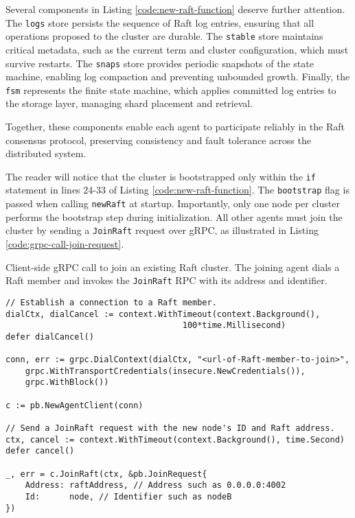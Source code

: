 Several components in Listing \ref{code:new-raft-function} deserve further attention.  
The \texttt{logs} store persists the sequence of Raft log entries, ensuring that all operations proposed to the cluster are durable. The \texttt{stable} store maintains critical metadata, such as the current term and cluster configuration, which must survive restarts. The \texttt{snaps} store provides periodic snapshots of the state machine, enabling log compaction and preventing unbounded growth. Finally, the \texttt{fsm} represents the finite state machine, which applies committed log entries to the storage layer, managing shard placement and retrieval.  

Together, these components enable each agent to participate reliably in the Raft consensus protocol, preserving consistency and fault tolerance across the distributed system.

The reader will notice that the cluster is bootstrapped only within the \texttt{if} statement in lines 24-33 of Listing \ref{code:new-raft-function}. The \texttt{bootstrap} flag is passed when calling \texttt{newRaft} at startup. Importantly, only one node per cluster performs the bootstrap step during initialization. All other agents must join the cluster by sending a \texttt{JoinRaft} request over gRPC, as illustrated in Listing \ref{code:grpc-call-join-request}.

\begin{listing}[H]
\caption{Client-side gRPC call to join an existing Raft cluster. The joining agent dials a Raft member and invokes the \texttt{JoinRaft} RPC with its address and identifier.}
\label{code:grpc-call-join-request}
\begin{verbatim}
// Establish a connection to a Raft member.
dialCtx, dialCancel := context.WithTimeout(context.Background(),
                                    100*time.Millisecond)
defer dialCancel()

conn, err := grpc.DialContext(dialCtx, "<url-of-Raft-member-to-join>",
    grpc.WithTransportCredentials(insecure.NewCredentials()),
    grpc.WithBlock())

c := pb.NewAgentClient(conn)

// Send a JoinRaft request with the new node's ID and Raft address.
ctx, cancel := context.WithTimeout(context.Background(), time.Second)
defer cancel()

_, err = c.JoinRaft(ctx, &pb.JoinRequest{
    Address: raftAddress, // Address such as 0.0.0.0:4002
    Id:      node, // Identifier such as nodeB
})
\end{verbatim}
\end{listing}

